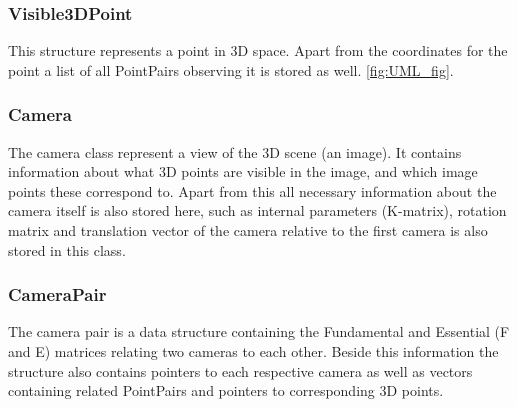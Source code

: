 \subsubsection{Visible3DPoint}
This structure represents a point in 3D space. Apart from the coordinates for the point a list of all PointPairs observing it is stored as well.  \ref{fig:UML_fig}. %

\subsubsection{Camera}
The camera class represent a view of the 3D scene (an image). It contains information about what 3D points are visible in the image, and which image points these correspond to. Apart from this all necessary information about the camera itself is also stored here, such as internal parameters (K-matrix), rotation matrix and translation vector of the camera relative to the first camera is also stored in this class.

\subsubsection{CameraPair}
The camera pair is a data structure containing the Fundamental and Essential (F and E) matrices relating two cameras to each other. Beside this information the structure also contains pointers to each respective camera as well as vectors containing related PointPairs and pointers to corresponding 3D points.